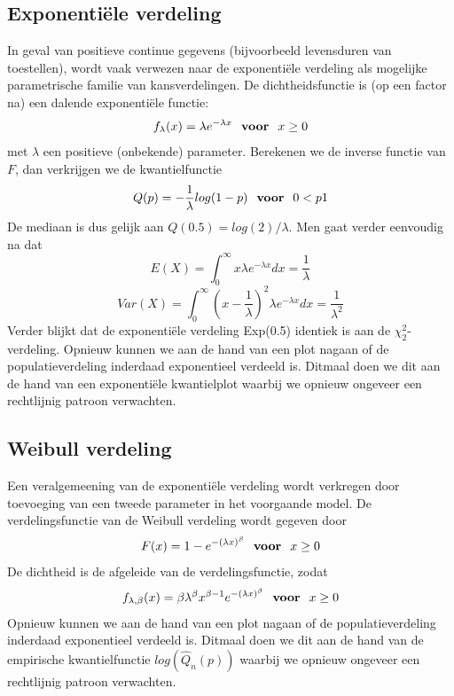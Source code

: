 \documentclass[titlepage]{article}
\numberwithin{equation}{section}
\begin{document}
\subsection{Exponentiële verdeling}
In geval van positieve continue gegevens (bijvoorbeeld levensduren van toestellen), wordt vaak verwezen naar de exponentiële verdeling als mogelijke parametrische familie van kansverdelingen.\newline\newline
De dichtheidsfunctie is (op een factor na) een dalende exponentiële functie:
\begin{equation}
	f_\lambda(x) = \lambda e^{-\lambda x} \text{ \textbf{ voor } } x \geq 0
	\label{4.34}
\end{equation}
met $\lambda$ een positieve (onbekende) parameter. Berekenen we de inverse functie van $F$, dan verkrijgen we de kwantielfunctie
\begin{equation}
	Q(p) = - \frac{1}{\lambda}log(1-p) \text{ \textbf{ voor } } 0<p1
	\label{4.35}
\end{equation}
De mediaan is dus gelijk aan $Q(0.5) = log(2)/\lambda$. Men gaat verder eenvoudig na dat
\begin{equation}
	E(X) = \int_0^\infty x\lambda e^{-\lambda x}dx = \frac{1}{\lambda}
	\label{4.36}
\end{equation}
\begin{equation}
	Var(X) = \int_0^\infty \left(x - \frac{1}{\lambda}\right)^2 \lambda e^{-\lambda x} dx = \frac{1}{\lambda^2}
	\label{4.37}
\end{equation}
Verder blijkt dat de exponentiële verdeling Exp(0.5) identiek is aan de $\chi^2_2$-verdeling.\newline\newline
\danger Opnieuw kunnen  we aan de hand van een plot nagaan of de populatieverdeling inderdaad exponentieel verdeeld is. Ditmaal doen we dit aan de hand van een exponentiële kwantielplot waarbij we opnieuw ongeveer een rechtlijnig patroon verwachten.
\subsection{Weibull verdeling}
Een veralgemeening van de exponentiële verdeling wordt verkregen door toevoeging van een tweede parameter in het voorgaande model. De verdelingsfunctie van de Weibull verdeling wordt gegeven door
\begin{equation*}
	F(x) = 1 - e^{-(\lambda x)^\beta} \text{ \textbf{ voor } } x \geq 0
\end{equation*}
De dichtheid is de afgeleide van de verdelingsfunctie, zodat
\begin{equation}
	f_{\lambda,\beta}(x) = \beta\lambda^\beta x^{\beta-1}e^{-(\lambda x)^\beta} \text{ \textbf{ voor } } x \geq 0
	\label{4.38}
\end{equation}
\danger Opnieuw kunnen  we aan de hand van een plot nagaan of de populatieverdeling inderdaad exponentieel verdeeld is. Ditmaal doen we dit aan de hand van de empirische kwantielfunctie $log(\hat{Q}_n(p))$  waarbij we opnieuw ongeveer een rechtlijnig patroon verwachten.
\end{document}

